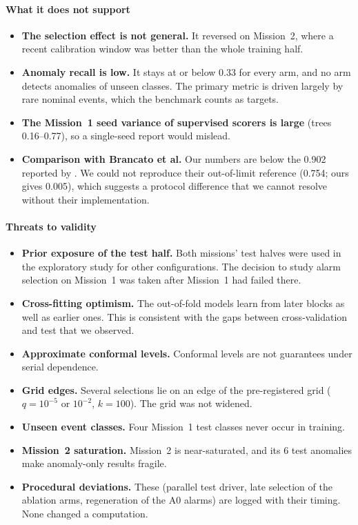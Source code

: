 \documentclass[preprint,12pt,authoryear]{elsarticle}
\begin{document}
\paragraph{What it does not support}
\begin{itemize}
\item \textbf{The selection effect is not general.} It reversed on Mission~2, where a recent
  calibration window was better than the whole training half.
\item \textbf{Anomaly recall is low.} It stays at or below 0.33 for every arm, and no arm
  detects anomalies of unseen classes. The primary metric is driven largely by rare nominal
  events, which the benchmark counts as targets.
\item \textbf{The Mission~1 seed variance of supervised scorers is large} (trees 0.16--0.77),
  so a single-seed report would mislead.
\item \textbf{Comparison with Brancato et al.} Our numbers are below the 0.902 reported by
  \citet{brancato2027ast}. We could not reproduce their out-of-limit reference (0.754;
  ours gives 0.005), which suggests a protocol difference that we cannot resolve without
  their implementation.
\end{itemize}

\paragraph{Threats to validity}
\begin{itemize}
\item \textbf{Prior exposure of the test half.} Both missions' test halves were used in the
  exploratory study for other configurations. The decision to study alarm selection on
  Mission~1 was taken after Mission~1 had failed there.
\item \textbf{Cross-fitting optimism.} The out-of-fold models learn from later blocks as
  well as earlier ones. This is consistent with the gaps between cross-validation and test
  that we observed.
\item \textbf{Approximate conformal levels.} Conformal levels are not guarantees under serial
  dependence.
\item \textbf{Grid edges.} Several selections lie on an edge of the pre-registered grid
  ($q=10^{-5}$ or $10^{-2}$, $k=100$). The grid was not widened.
\item \textbf{Unseen event classes.} Four Mission~1 test classes never occur in training.
\item \textbf{Mission~2 saturation.} Mission~2 is near-saturated, and its 6 test anomalies
  make anomaly-only results fragile.
\item \textbf{Procedural deviations.} These (parallel test driver, late selection of the
  ablation arms, regeneration of the A0 alarms) are logged with their timing. None changed
  a computation.
\end{itemize}
\end{document}
